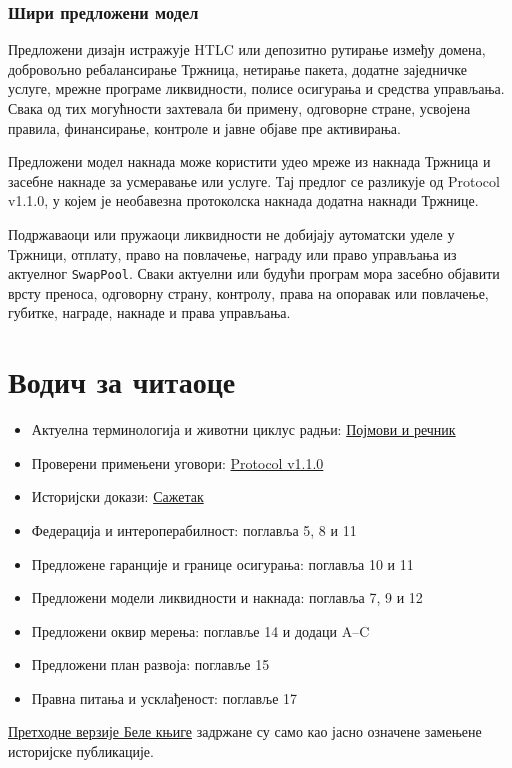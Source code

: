 \documentclass[11pt]{article}
\begin{document}
\subsubsection*{Шири предложени модел}

Предложени дизајн истражује HTLC или депозитно рутирање између домена, добровољно ребалансирање Тржница, нетирање пакета, додатне заједничке услуге, мрежне програме ликвидности, полисе осигурања и средства управљања. Свака од тих могућности захтевала би примену, одговорне стране, усвојена правила, финансирање, контроле и јавне објаве пре активирања.

Предложени модел накнада може користити удео мреже из накнада Тржница и засебне накнаде за усмеравање или услуге. Тај предлог се разликује од Protocol v1.1.0, у којем је необавезна протоколска накнада додатна накнади Тржнице.

Подржаваоци или пружаоци ликвидности не добијају аутоматски уделе у Тржници, отплату, право на повлачење, награду или право управљања из актуелног \texttt{SwapPool}. Сваки актуелни или будући програм мора засебно објавити врсту преноса, одговорну страну, контролу, права на опоравак или повлачење, губитке, награде, накнаде и права управљања.

\section*{Водич за читаоце}

\begin{itemize}[leftmargin=*]
\item Актуелна терминологија и животни циклус радњи: \href{https://docs.cosmolocal.credit/sr/introduction/concepts}{Појмови и речник}
\item Проверени примењени уговори: \href{https://docs.cosmolocal.credit/sr/protocol/overview}{Protocol v1.1.0}
\item Историјски докази: \href{https://docs.cosmolocal.credit/sr/white-paper/executive-summary}{Сажетак}
\item Федерација и интероперабилност: поглавља 5, 8 и 11
\item Предложене гаранције и границе осигурања: поглавља 10 и 11
\item Предложени модели ликвидности и накнада: поглавља 7, 9 и 12
\item Предложени оквир мерења: поглавље 14 и додаци A--C
\item Предложени план развоја: поглавље 15
\item Правна питања и усклађеност: поглавље 17
\end{itemize}
\href{https://docs.cosmolocal.credit/sr/white-paper/archive}{Претходне верзије Беле књиге} задржане су само као јасно означене замењене историјске публикације.
\end{document}
